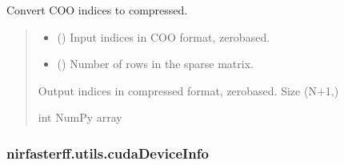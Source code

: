\documentclass[letterpaper,10pt,english]{sphinxmanual}
\begin{document}
\begin{fulllineitems}
\label{\detokenize{_autosummary/nirfasterff.utils.compress_coo:nirfasterff.utils.compress_coo}}
\pysigstartsignatures
\pysiglinewithargsret
{}
{\sphinxparamcomma {}}
{}
\pysigstopsignatures
\sphinxAtStartPar
Convert COO indices to compressed.
\begin{quote}\begin{description}
\begin{itemize}
\item {} 
\sphinxAtStartPar
{} () \textendash{} Input indices in COO format, zero\sphinxhyphen{}based.

\item {} 
\sphinxAtStartPar
{} () \textendash{} Number of rows in the sparse matrix.

\end{itemize}

\sphinxAtStartPar
Output indices in compressed format, zero\sphinxhyphen{}based. Size (N+1,)

\sphinxAtStartPar
int NumPy array

\end{description}\end{quote}

\end{fulllineitems}


\sphinxstepscope


\subsubsection{nirfasterff.utils.cudaDeviceInfo}
\label{\detokenize{_autosummary/nirfasterff.utils.cudaDeviceInfo:nirfasterff-utils-cudadeviceinfo}}\label{\detokenize{_autosummary/nirfasterff.utils.cudaDeviceInfo::doc}}
\end{document}
